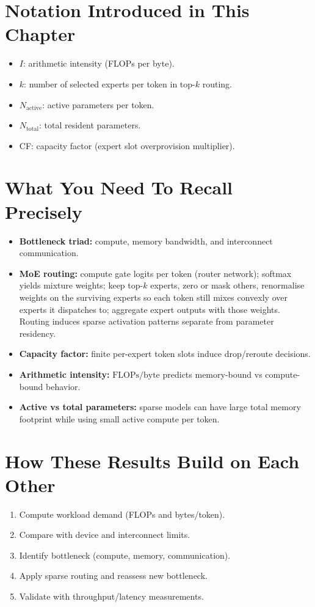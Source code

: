 \section*{Notation Introduced in This Chapter}
\begin{itemize}[leftmargin=1.5em]
  \item $I$: arithmetic intensity (FLOPs per byte).
  \item $k$: number of selected experts per token in top-$k$ routing.
  \item $N_{\text{active}}$: active parameters per token.
  \item $N_{\text{total}}$: total resident parameters.
  \item CF: capacity factor (expert slot overprovision multiplier).
\end{itemize}

\section*{What You Need To Recall Precisely}
\begin{itemize}[leftmargin=1.5em]
  \item \textbf{Bottleneck triad:} compute, memory bandwidth, and interconnect communication.
  \item \textbf{MoE routing:} compute gate logits per token (router network); softmax yields mixture weights; keep top-$k$ experts, zero or mask others, renormalise weights on the surviving experts so each token still mixes convexly over experts it dispatches to; aggregate expert outputs with those weights. Routing induces sparse activation patterns separate from parameter residency.
  \item \textbf{Capacity factor:} finite per-expert token slots induce drop/reroute decisions.
  \item \textbf{Arithmetic intensity:} $\text{FLOPs}/\text{byte}$ predicts memory-bound vs compute-bound behavior.
  \item \textbf{Active vs total parameters:} sparse models can have large total memory footprint while using small active compute per token.
\end{itemize}

\section*{How These Results Build on Each Other}
\begin{enumerate}[leftmargin=1.5em]
  \item Compute workload demand (FLOPs and bytes/token).
  \item Compare with device and interconnect limits.
  \item Identify bottleneck (compute, memory, communication).
  \item Apply sparse routing and reassess new bottleneck.
  \item Validate with throughput/latency measurements.
\end{enumerate}

